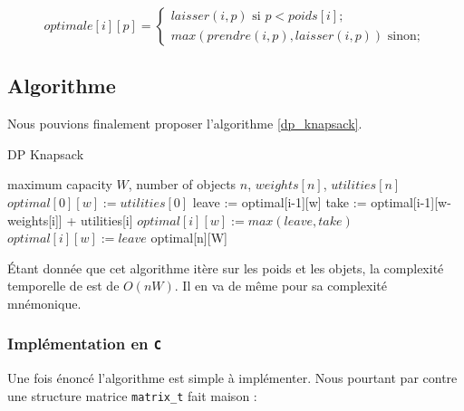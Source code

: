\begin{equation}
\label{prendre_ou_laisser}
optimale[i][p] =
	\begin{cases}
		laisser(i, p) \text{ si } p < poids[i];	\\
		max(prendre(i, p), laisser(i, p)) \text{ sinon};
	\end{cases}
\end{equation}


\subsection{Algorithme}

Nous pouvions finalement proposer l'algorithme \ref{dp_knapsack}.

\begin{algorithm}[!ht]
\caption{DP Knapsack}
\label{dp_knapsack}
\begin{algorithmic}[1]
\REQUIRE maximum capacity $W$, number of objects $n$, $weights[n]$, $utilities[n]$  
		\STATE $optimal[0][w] := utilities[0]$
	\ENDIF
\ENDFOR
{}
		\STATE leave := optimal[i-1][w]
		\STATE take := optimal[i-1][w-weights[i]] + utilities[i]
			\STATE $optimal[i][w] := max(leave, take)$
		\ELSE
			\STATE $optimal[i][w] := leave$
		\ENDIF
	\ENDFOR
\ENDFOR
\RETURN optimal[n][W]
\end{algorithmic}
\end{algorithm}

Étant donnée que cet algorithme itère sur les poids et les objets, la complexité temporelle de est de $O(nW)$. Il en va de même pour sa complexité mnémonique.

\subsubsection{Implémentation en \texttt{C}}
Une fois énoncé l'algorithme est simple à implémenter. Nous pourtant par contre une structure matrice \texttt{matrix\_t} fait maison : 

 


